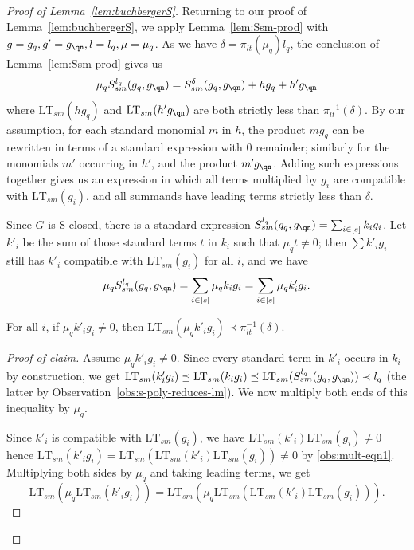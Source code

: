 \documentclass[11pt,reqno]{amsart}
\newcommand{\ltsm}{\text{LT}_{sm}}
\newcommand{\Ssm}{S_{sm}}
\theoremstyle{definition}
\numberwithin{equation}{section}
\begin{document}
\begin{proof}[Proof of Lemma~\ref{lem:buchbergerS}]
Returning to our proof of Lemma~\ref{lem:buchbergerS}, we apply Lemma~\ref{lem:Ssm-prod} with $g = g_q, g' = g_{\qn}, l = l_q, \mu = \mu_q$. As we have $\delta = \pi_{lt}(\mu_q) l_q$, the conclusion of Lemma~\ref{lem:Ssm-prod} gives us
\[
\mu_q \Ssm^{l_q}(g_q,g_{\qn}) = \Ssm^{\delta}(g_q,g_{\qn}) + hg_q + h'g_{\qn}
\]
where $\ltsm(h g_q)$ and $\ltsm(h' g_{\qn})$ are both strictly less than $\pi_{lt}^{-1}(\delta)$. By our assumption, for each standard monomial $m$ in $h$, the product $m g_q$ can be rewritten in terms of a standard expression with 0 remainder; similarly for the monomials $m'$ occurring in $h'$, and the product $m' g_{\qn}$. Adding such expressions together gives us an expression in which all terms multiplied by $g_i$ are compatible with $\ltsm(g_i)$, and all summands have leading terms strictly less than $\delta$.

Since $G$ is S-closed, there is a standard expression $\Ssm^{l_q}(g_q, g_{\qn}) = \sum_{i \in [s]} k_i g_i$. Let $k'_i$ be the sum of those standard terms $t$ in $k_i$ such that $\mu_q t \neq 0$; then $\sum k'_i g_i$ still has $k'_i$ compatible with $\ltsm(g_i)$ for all $i$, and we have
\begin{equation} \label{eq:muq-s-lq}
\mu_q \Ssm^{l_q}(g_q, g_{\qn}) = \sum_{i \in [s]} \mu_q k_i g_i = \sum_{i \in [s]} \mu_q k'_i g_i.
\end{equation}

\begin{claim} \label{claim:delta}
For all $i$, if $\mu_q k'_i g_i \neq 0$, then $\ltsm(\mu_q k'_i g_i) \prec \pi_{lt}^{-1}(\delta)$.
\end{claim}

\begin{proof}[Proof of claim]
Assume $\mu_q k'_i g_i \neq 0$. Since every standard term in $k'_i$ occurs in $k_i$ by construction, we get $\ltsm(k'_i g_i) \preceq \ltsm(k_i g_i) \preceq \ltsm(\Ssm^{l_q}(g_q, g_{\qn})) \prec l_q$ (the latter by Observation~\ref{obs:s-poly-reduces-lm}). We now multiply both ends of this inequality by $\mu_q$. 

Since $k'_i$ is compatible with $\ltsm(g_i)$, we have $\ltsm(k'_i) \ltsm(g_i) \neq 0$ hence $\ltsm(k'_i g_i) = \ltsm(\ltsm(k'_i) \ltsm(g_i)) \neq 0$ by \eqref{obs:mult-eqn1}. Multiplying both sides by $\mu_q$ and taking leading terms, we get
\begin{equation} \label{eq:im-so-tired-of-coming-up-with-temporary-names1}
\ltsm(\mu_q \ltsm(k'_i g_i)) = \ltsm(\mu_q \ltsm(\ltsm(k'_i) \ltsm(g_i))).
\end{equation}


\end{proof}
\end{proof}
\end{document}
